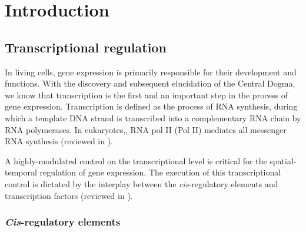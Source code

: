 \chapter{Introduction} \label{ch:intro}

\section{Transcriptional regulation}

In living cells, gene expression is primarily responsible for their development and functions. With the discovery and subsequent elucidation of the Central Dogma, we know that transcription is the first and an important step in the process of gene expression. Transcription is defined as the process of RNA synthesis, during which a template DNA strand is transcribed into a complementary RNA chain by RNA polymerases. In eukaryotes,, RNA pol II (Pol II) mediates all messenger RNA synthesis (reviewed in \cite{kornberg1974chromatin}).

A highly-modulated control on the transcriptional level is critical for the spatial-temporal regulation of gene expression. The execution of this transcriptional control is dictated by the interplay between the \textit{cis}-regulatory elements and transcription factors (reviewed in \cite{fuda2009defining}).

\subsection{\textit{Cis}-regulatory elements}

